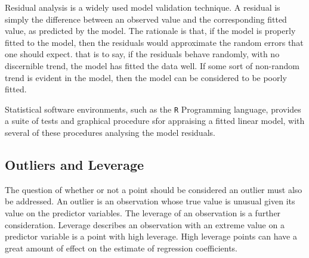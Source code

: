 \documentclass[12pt, a4paper]{article}
\begin{document}

Residual analysis is a widely used model validation technique. A residual is simply the difference between an observed value and the corresponding fitted value, as predicted by the model. The rationale is that, if the model is properly fitted to the model, then the residuals would approximate the random errors that one should expect.
that is to say, if the residuals behave randomly, with no discernible trend, the model has fitted the data well. If some sort of non-random trend is evident in the model, then the model can be considered to be poorly fitted.


Statistical software environments, such as the \texttt{R} Programming language, provides a suite of tests and graphical procedure sfor appraising a fitted linear model, with several 
of these procedures analysing the model residuals.





\subsection{Outliers and Leverage}



The question of whether or not a point should be considered an outlier must also be addressed. An outlier is an observation whose true value is unusual given its value on the predictor variables. The leverage of an observation is a further consideration. Leverage describes an observation with an extreme value on a predictor variable is a point with high leverage. High leverage points can have a great amount of effect on the estimate of regression coefficients.
\end{document}
